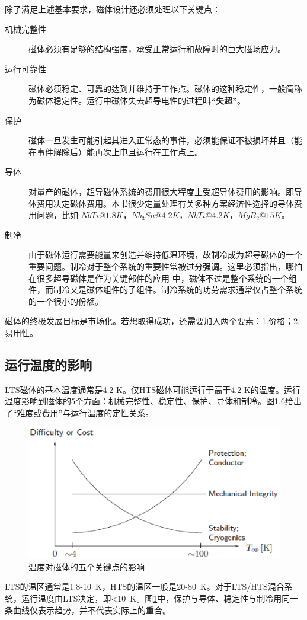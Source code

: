 除了满足上述基本要求，磁体设计还必须处理以下关键点：
\begin{description}
  \item[机械完整性] 磁体必须有足够的结构强度，承受正常运行和故障时的巨大磁场应力。
  \item[运行可靠性] 磁体必须稳定、可靠的达到并维持于工作点。磁体的这种稳定性，一般简称为磁体稳定性。运行中磁体失去超导电性的过程叫\textbf{“失超”}。
  \item[保护] 磁体一旦发生可能引起其进入正常态的事件，必须能保证不被损坏并且（能在事件解除后）能再次上电且运行在工作点上。
  \item[导体] 对量产的磁体，超导磁体系统的费用很大程度上受超导体费用的影响。即导体费用决定磁体费用。本书很少定量处理有关多种方案经济性选择的导体费用问题，比如
$NbTi@1.8K$，$Nb_3Sn@4.2K$，$NbTi@4.2K$，$MgB_2@15K$。
  \item[制冷] 由于磁体运行需要能量来创造并维持低温环境，故制冷成为超导磁体的一个重要问题。制冷对于整个系统的重要性常被过分强调。这里必须指出，哪怕在很多超导磁体是作为关键部件的应用
  中，磁体不过是整个系统的一个组件，而制冷又是磁体组件的子组件。制冷系统的功劳需求通常仅占整个系统的一个很小的份额。
\end{description}

磁体的终极发展目标是市场化。若想取得成功，还需要加入两个要素：1.价格；2.易用性。

\subsection{运行温度的影响}
LTS磁体的基本温度通常是4.2 K。仅HTS磁体可能运行于高于4.2 K的温度。运行温度影响到磁体的5个方面：机械完整性、稳定性、保护、导体和制冷。图1.6给出了“难度或费用”与运行温度的定性关系。
\begin{figure}
  \centering
 \includegraphics[scale=0.6]{chpt1/figs/fig1.6.eps}
  \caption{
温度对磁体的五个关键点的影响
}\label{temperatureeffect}
\end{figure}
LTS的温区通常是1.8-10\ K，HTS的温区一般是20-80\ K。对于LTS/HTS混合系统，运行温度由LTS决定，即<10\ K。图\ref{temperatureeffect}中，保护与导体、稳定性与制冷用同一条曲线仅表示趋势，并不代表实际上的重合。

